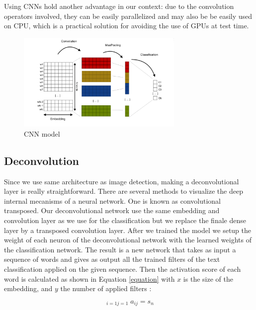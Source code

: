 Using CNNs hold another advantage in our context: due to the convolution operators involved, they can be easily parallelized and may also be be easily used on CPU, 
which is a practical solution for avoiding the use of GPUs at test time. 

\begin{figure}[h]
\begin{center}
\includegraphics[width=8cm]{img/model_classif.png}
\caption{CNN model}
\label{cnn}
\end{center}
\end{figure}

\subsection{Deconvolution}

Since we use same architecture as image detection, making a deconvolutional layer is really straightforward. There are several methods to visualize the deep internal mecanisms of a neural network. One is known as convolutional transposed. Our deconvolutional network use the same embedding and convolution layer as we use for the classification but we replace the finale dense layer by a transposed convolution layer. After we trained the model we setup the weight of each neuron of the deconvolutional network with the learned weights of the classification network. The result is a new network that takes as input a sequence of words and gives as output all the trained filters of the text classification applied on the given sequence. Then the activation score of each word is calculated as shown in Equation \ref{equation} with $x$ is the size of the embedding, and $y$ the number of applied filters : 

\begin{equation}
\mathop{\sum^{x}\sum^{y}}_{i=1  j=1}  a_{ij} = s_{n}
\label{equation}
\end{equation}

